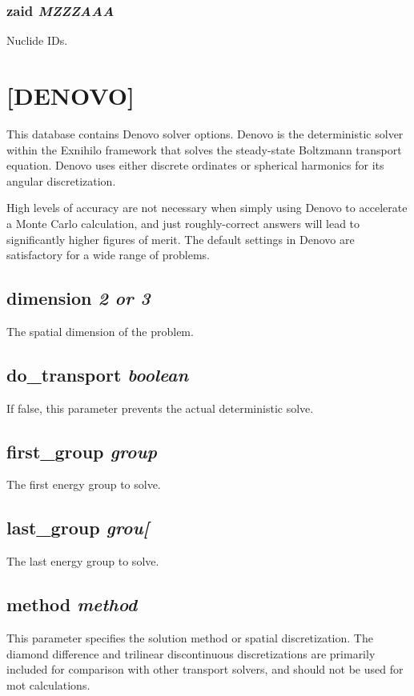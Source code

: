 \documentclass[10pt]{article}
\begin{document}
\subsubsection{zaid \textit{MZZZAAA}}
Nuclide IDs. 

\section{[DENOVO]}
This database contains Denovo solver options. Denovo is the deterministic solver within the Exnihilo framework that solves the steady-state Boltzmann transport equation. Denovo uses either discrete ordinates or spherical harmonics for its angular discretization. 

High levels of accuracy are not necessary when simply using Denovo to accelerate a Monte Carlo calculation, and just roughly-correct answers will lead to significantly higher figures of merit. The default settings in Denovo are satisfactory for a wide range of problems. 

\subsection{dimension \textit{2 or 3}}
The spatial dimension of the problem.

\subsection{do\_transport \textit{boolean}}
If false, this parameter prevents the actual deterministic solve. 

\subsection{first\_group \textit{group}}
The first energy group to solve.

\subsection{last\_group \textit{grou[}}
The last energy group to solve.

\subsection{method \textit{method}}
This parameter specifies the solution method or spatial discretization. The diamond difference and trilinear discontinuous discretizations are primarily included for comparison with other transport solvers, and should not be used for mot calculations.\newline
\end{document}

